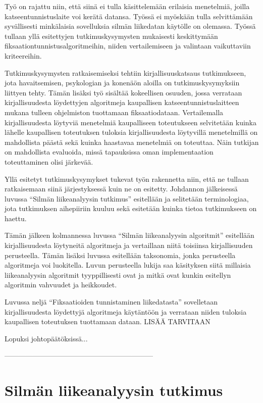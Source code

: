 Työ on rajattu niin, että siinä ei tulla käsittelemään erilaisia menetelmiä, joilla katseentunnistuslaite voi kerätä datansa. Työssä ei myöskään tulla selvittämään syvällisesti minkälaisia sovelluksia silmän liikedatan käytölle on olemassa. Työssä tullaan yllä esitettyjen tutkimuskysymysten mukaisesti keskittymään fiksaationtunnistusalgoritmeihin, niiden vertailemiseen ja valintaan vaikuttaviin kriteereihin.

Tutkimuskysymysten ratkaisemiseksi tehtiin kirjallisuuskatsaus tutkimukseen, jota havaitsemisen, psykologian ja konenäön aloilla on tutkimuskysymyksiin liittyen tehty. Tämän lisäksi työ sisältää kokeellisen osuuden, jossa verrataan kirjallisuudesta löydettyjen algoritmeja kaupallisen katseentunnistuslaitteen mukana tulleen ohjelmiston tuottamaan fiksaatiodataan. Vertailemalla kirjallisuudesta löytyviä menetelmiä kaupalliseen toteutukseen selvitetään kuinka lähelle kaupallisen toteutuksen tuloksia kirjallisuudesta löytyvillä menetelmillä on mahdollista päästä sekä kuinka haastavaa menetelmiä on toteuttaa. Näin tutkijan on mahdollista evaluoida, missä tapauksissa oman implementaation toteuttaminen olisi järkevää.

Yllä esitetyt tutkimuskysymykset tukevat työn rakennetta niin, että ne tullaan ratkaisemaan siinä järjestyksessä kuin ne on esitetty. Johdannon jälkeisessä luvussa ``Silmän liikeanalyysin tutkimus''  esitellään ja selitetään terminologiaa, jota tutkimuksen aihepiiriin kuuluu sekä esitetään kuinka tietoa tutkimukseen on haettu. 

Tämän jälkeen kolmannessa luvussa ``Silmän liikeanalyysin algoritmit''  esitellään kirjallisuudesta löytyneitä algoritmeja ja vertaillaan niitä toisiinsa kirjallisuuden perusteella. Tämän lisäksi luvussa esitellään taksonomia, jonka perusteella algoritmeja voi luokitella. Luvun perusteella lukija saa käsityksen siitä millaisia liikeanalyysin algoritmit tyyppillisesti ovat ja mitkä ovat kunkin esitellyn algoritmin vahvuudet ja heikkoudet.

Luvussa neljä ``Fiksaatioiden tunnistaminen liikedatasta''  sovelletaan kirjallisuudesta löydettyjä algoritmeja käytäntöön ja verrataan niiden tuloksia kaupallisen toteutuksen tuottamaan dataan. LISÄÄ TARVITAAN

Lopuksi johtopäätöksissä...
 

---------------------------------------------------------------
\section{Silmän liikeanalyysin tutkimus}

